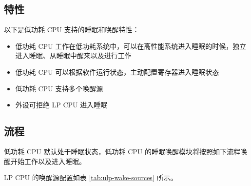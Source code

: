 \documentclass[main\_\_CN.tex]{subfiles}
\begin{document}
\subsection{特性}

以下是低功耗 CPU 支持的睡眠和唤醒特性：

\begin{itemize}
    \item 低功耗 CPU 工作在低功耗系统中，可以在高性能系统进入睡眠的时候，独立进入睡眠、从睡眠中醒来以及进行工作
    \item 低功耗 CPU 可以根据软件运行状态，主动配置寄存器进入睡眠状态
    \item 低功耗 CPU 支持多个唤醒源
   \item 外设可拒绝 LP CPU 进入睡眠
\end{itemize}

\subsection{流程}

低功耗 CPU 默认处于睡眠状态，低功耗 CPU 的睡眠唤醒模块将按照如下流程唤醒开始工作以及进入睡眠。

LP CPU 的唤醒源配置如表 \ref{tab:ulp-wake-sources} 所示。
\end{document}
